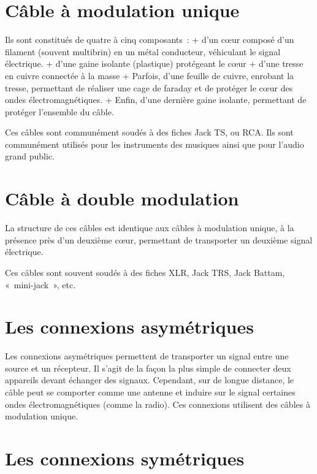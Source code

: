 \documentclass[
]{book}
\begin{document}
\hypertarget{cuxe2ble-uxe0-modulation-unique}{%
\section{Câble à modulation unique}\label{cuxe2ble-uxe0-modulation-unique}}

Ils sont constitués de quatre à cinq composants~:
+ d'un cœur composé d'un filament (souvent multibrin) en un métal conducteur, véhiculant le signal électrique.
+ d'une gaine isolante (plastique) protégeant le cœur
+ d'une tresse en cuivre connectée à la masse
+ Parfois, d'une feuille de cuivre, enrobant la tresse, permettant de réaliser une cage de faraday et de protéger le cœur des ondes électromagnétiques.
+ Enfin, d'une dernière gaine isolante, permettant de protéger l'ensemble du câble.

Ces câbles sont communément soudés à des fiches Jack TS, ou RCA. Ils sont communément utilisés pour les instruments des musiques ainsi que pour l'audio grand public.

\hypertarget{cuxe2ble-uxe0-double-modulation}{%
\section{Câble à double modulation}\label{cuxe2ble-uxe0-double-modulation}}

La structure de ces câbles est identique aux câbles à modulation unique, à la présence près d'un deuxième cœur, permettant de transporter un deuxième signal électrique.

Ces câbles sont souvent soudés à des fiches XLR, Jack TRS, Jack Battam, «~mini-jack~», etc.

\hypertarget{les-connexions-asymuxe9triques}{%
\section{Les connexions asymétriques}\label{les-connexions-asymuxe9triques}}

Les connexions asymétriques permettent de transporter un signal entre une source et un récepteur. Il s'agit de la façon la plus simple de connecter deux appareils devant échanger des signaux. Cependant, sur de longue distance, le câble peut se comporter comme une antenne et induire sur le signal certaines ondes électromagnétiques (comme la radio). Ces connexions utilisent des câbles à modulation unique.

\hypertarget{les-connexions-symuxe9triques}{%
\section{Les connexions symétriques}\label{les-connexions-symuxe9triques}}
\end{document}
